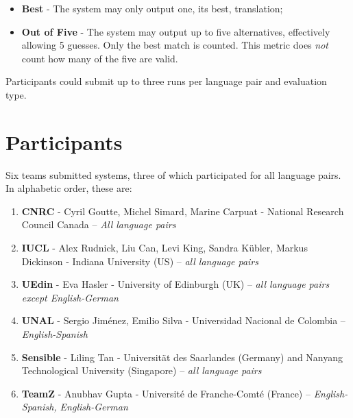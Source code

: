 \begin{itemize}
     \item \textbf{Best} - The system may only output one, its best, translation;
     \item \textbf{Out of Five} - The system may output up to five alternatives, effectively allowing 5 guesses. Only the best match is counted. This metric does \emph{not} count how many of the five are valid.
\end{itemize}

Participants could submit up to three runs per language pair and evaluation type.

\section{Participants}

Six teams submitted systems, three of which participated for all language pairs. In alphabetic order, these are:

\begin{enumerate}
\item \textbf{CNRC} - Cyril Goutte, Michel Simard, Marine Carpuat - National Research Council Canada -- \emph{All language pairs}
\item \textbf{IUCL} - Alex Rudnick, Liu Can, Levi King, Sandra Kübler, Markus Dickinson - Indiana University (US) -- \emph{all language pairs}
\item \textbf{UEdin} - Eva Hasler - University of Edinburgh (UK) -- \emph{all language pairs except English-German}
\item \textbf{UNAL} - Sergio Jiménez, Emilio Silva - Universidad Nacional de Colombia -- \emph{English-Spanish}
\item \textbf{Sensible} - Liling Tan - Universität des Saarlandes (Germany) and Nanyang Technological University (Singapore) -- \emph{all language pairs}
\item \textbf{TeamZ} - Anubhav Gupta - Université de Franche-Comté (France) -- \emph{English-Spanish, English-German}
\end{enumerate}


